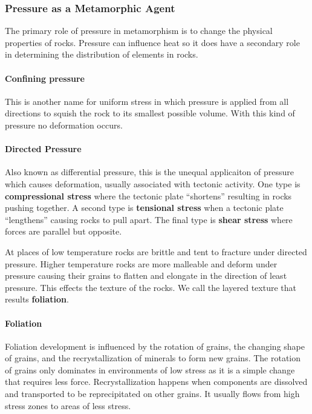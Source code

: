 \documentclass{article}
\begin{document}
\subsubsection{Pressure as a Metamorphic Agent} %
\label{sub:pressure_as_a_metamorphic_agent}
The primary role of pressure in metamorphism is to change the physical properties of rocks. Pressure can influence heat so it does have a secondary role in determining the distribution of elements in rocks.

\paragraph{Confining pressure} %
\label{par:confining_pressure}
This is another name for uniform stress in which pressure is applied from all directions to squish the rock to its smallest possible volume. With this kind of pressure no deformation occurs.

\paragraph{Directed Pressure} %
\label{par:directed_pressure}
Also known as differential pressure, this is the unequal applicaiton of pressure which causes deformation, usually associated with tectonic activity. One type is \textbf{compressional stress} where the tectonic plate ``shortens'' resulting in rocks pushing together. A second type is \textbf{tensional stress} when a tectonic plate ``lengthens'' causing rocks to pull apart. The final type is \textbf{shear stress} where forces are parallel but opposite.

At places of low temperature rocks are brittle and tent to fracture under directed pressure. Higher temperature rocks are more malleable and deform under pressure causing their grains to flatten and elongate in the direction of least pressure. This effects the texture of the rocks. We call the layered texture that results \textbf{foliation}.
\paragraph{Foliation} %
\label{par:foliation}
Foliation development is influenced by the rotation of grains, the changing shape of grains, and the recrystallization of minerals to form new grains. The rotation of grains only dominates in environments of low stress as it is a simple change that requires less force. Recrystallization happens when components are dissolved and transported to be reprecipitated on other grains. It usually flows from high stress zones to areas of less stress.
\end{document}
